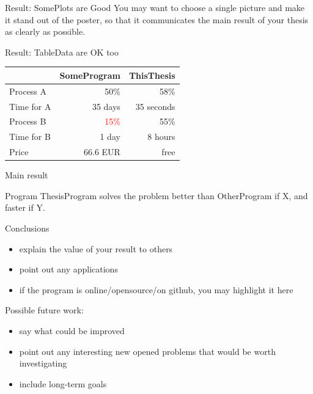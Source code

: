 \documentclass[portrait,a0paper,fontscale=0.25]{baposter}
\begin{document}
\begin{poster}
\begin{posterbox}[column=1, name=result1]{Result: SomePlots are Good}
You may want to choose a single picture and make it stand out of the poster, so that it communicates the main result of your thesis as clearly as possible.
\end{posterbox}

\begin{posterbox}[column=1, name=result2, below=result1]{Result: TableData are OK too}
\begin{center}
\begin{tabular}{lrr}
 & \textbf{SomeProgram} & \textbf{ThisThesis} \\
\hline
Process A & 50\% & 58\% \\
Time for A & 35 days & \textcolor{green!80!black}{35 seconds} \\
Process B & \textcolor{red}{15\%} & 55\% \\
Time for B & 1 day & 8 hours \\
Price & 66.6 EUR & free
\end{tabular}
\end{center}
\end{posterbox}

\begin{posterbox}[column=1, name=result3, below=result2, headerColorOne=green!50!yellow, boxColorOne=green!10]{Main result}
\large\bfseries
\vspace{1ex}
\begin{center}
Program ThesisProgram solves the problem better than OtherProgram if X, and faster if Y.
\end{center}
\vspace{.5ex}
\end{posterbox}

\begin{posterbox}[column=1, name=conclusion, below=result3, bottomaligned=something2]{Conclusions}
\begin{itemize}
\item explain the value of your result to others
\item point out any applications
\item if the program is online/opensource/on github, you may highlight it here
\end{itemize}
Possible future work:
\begin{itemize}
\item say what could be improved
\item point out any interesting new opened problems that would be worth investigating
\item include long-term goals
\end{itemize}
\end{posterbox}

\end{poster}
\end{document}
